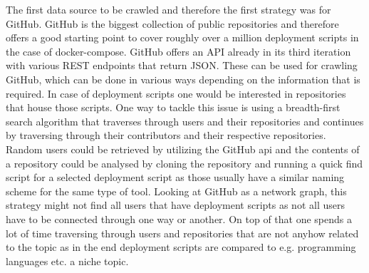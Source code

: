 The first data source to be crawled and therefore the first strategy was for GitHub. GitHub is the biggest collection of public repositories and therefore offers a good starting point to cover roughly over a million deployment scripts in the case of docker-compose.
GitHub offers an API already in its third iteration with various REST endpoints that return JSON. These can be used for crawling GitHub, which can be done in various ways depending on the information that is required. In case of deployment scripts one would be interested in repositories that house those scripts.
One way to tackle this issue is using a breadth-first search algorithm that traverses through users and their repositories and continues by traversing through their contributors and their respective repositories. Random users could be retrieved by utilizing the GitHub api and the contents of a repository could be analysed by cloning the repository and running a quick find script for a selected deployment script as those usually have a similar naming scheme for the same type of tool. Looking at GitHub as a network graph, this strategy might not find all users that have deployment scripts as not all users have to be connected through one way or another. On top of that one spends a lot of time traversing through users and repositories that are not anyhow related to the topic as in the end deployment scripts are compared to e.g. programming languages etc. a niche topic.

